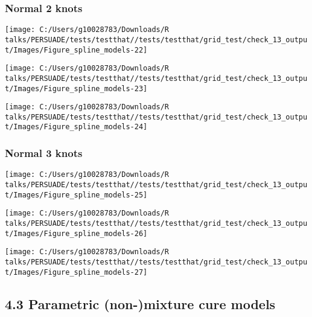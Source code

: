 \documentclass[
]{article}
\begin{document}
\subsubsection{Normal 2 knots}\label{normal-2-knots}

\begin{flushleft}\texttt{[image: C:/Users/g10028783/Downloads/R talks/PERSUADE/tests/testthat//tests/testthat/grid\_test/check\_13\_output/Images/Figure\_spline\_models-22]} \end{flushleft}

\begin{flushleft}\texttt{[image: C:/Users/g10028783/Downloads/R talks/PERSUADE/tests/testthat//tests/testthat/grid\_test/check\_13\_output/Images/Figure\_spline\_models-23]} \end{flushleft}

\begin{flushleft}\texttt{[image: C:/Users/g10028783/Downloads/R talks/PERSUADE/tests/testthat//tests/testthat/grid\_test/check\_13\_output/Images/Figure\_spline\_models-24]} \end{flushleft}

\clearpage

\subsubsection{Normal 3 knots}\label{normal-3-knots}

\begin{flushleft}\texttt{[image: C:/Users/g10028783/Downloads/R talks/PERSUADE/tests/testthat//tests/testthat/grid\_test/check\_13\_output/Images/Figure\_spline\_models-25]} \end{flushleft}

\begin{flushleft}\texttt{[image: C:/Users/g10028783/Downloads/R talks/PERSUADE/tests/testthat//tests/testthat/grid\_test/check\_13\_output/Images/Figure\_spline\_models-26]} \end{flushleft}

\begin{flushleft}\texttt{[image: C:/Users/g10028783/Downloads/R talks/PERSUADE/tests/testthat//tests/testthat/grid\_test/check\_13\_output/Images/Figure\_spline\_models-27]} \end{flushleft}

\clearpage

\subsection{4.3 Parametric (non-)mixture cure
models}\label{parametric-non-mixture-cure-models}
\end{document}
